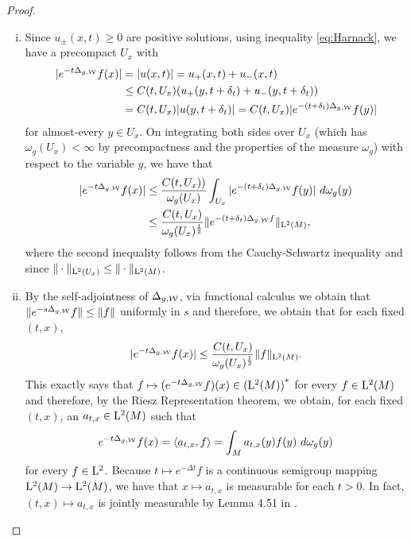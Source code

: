 \documentclass[a4paper, 12pt]{amsart}
\begin{document}
\begin{proof}
\begin{enumerate}[(i)]
\item  Since $u_{\pm}(x,t) \geq 0$ are positive solutions,
	using inequality \eqref{eq:Harnack}, we have a precompact $U_x$ 
	with 
	\begin{align*} 
	|e^{-t \Delta_{g,\mathcal{W}}}f(x)|  &= |u(x,t)| = u_+(x,t) + u_-(x,t) \\
		&\leq C(t,U_x) (u_+(y,t+\delta_t) + u_-(y,t+\delta_t)) \\
		&= C(t,U_x) |u(y,t + \delta_t)|
		= C(t,U_x)  |e^{-(t + \delta_t) \Delta_{g,\mathcal{W}}}f(y)|
	\end{align*} 
	for almost-every $y \in U_x$.
	On integrating both sides over $U_x$ (which has $\omega_g(U_x) < \infty$
	by precompactness and the properties of the measure $\omega_g$) with respect
	to the variable $y$,
	we have that
	\begin{align*} 
	|e^{-t \Delta_{g,\mathcal{W}}}f(x)| 
		&\leq \frac{C(t,U_x))}{\omega_g(U_x)} \int_{U_x} |e^{-(t + \delta_t) \Delta_{g,\mathcal{W}}}f(y)|\ d\omega_g(y) \\
		&\leq \frac{C(t,U_x)}{\omega_g(U_x)^{\frac{1}{2}}} \| e^{-(t + \delta_t) \Delta_{g,\mathcal{W}}f} \|_{{\rm L}^{2}_{\rm {}}(M)},
	\end{align*}
	where the second inequality follows from the Cauchy-Schwartz
	inequality and since $\| \cdot \|_{{\rm L}^{2}_{\rm {}}(U_x)} \leq \| \cdot \|_{{\rm L}^{2}_{\rm {}}(M)}$.

\item By the self-adjointness of $\Delta_{g,\mathcal{W}}$, via functional calculus 
	we obtain that $\| e^{-s\Delta_{g,\mathcal{W}}}f \| \leq \| f \|$
	uniformly in $s$  and therefore, we obtain that for each fixed \((t, x)\),
	$$|e^{-t \Delta_{g,\mathcal{W}}}f(x)| \leq 
		\frac{C(t,U_x)}{\omega_g(U_x)^{\frac{1}{2}}} \| f \|_{{\rm L}^{2}_{\rm {}}(M)}.$$
	This exactly says that $f \mapsto (e^{-t\Delta_{g,\mathcal{W}}}f)(x) \in {({\rm L}^{2}_{\rm {}}(M))}^\ast$
	for every $f \in {\rm L}^{2}_{\rm {}}(M)$ and therefore, by the Riesz Representation theorem,
	we obtain, for each fixed \((t, x)\), an $a_{t,x} \in {\rm L}^{2}_{\rm {}}(M)$ such that
	$$ e^{-t \Delta_{g,\mathcal{W}}}f(x) = \langle a_{t,x},f \rangle = \int_{M} a_{t,x}(y)f(y)\ d\omega_g(y)$$
        for every \(f \in {\rm L}^{2}_{\rm {}}\). Because \(t \mapsto e^{-\Delta t} f\) is a continuous semigroup mapping 
	\({\rm L}^{2}_{\rm {}}(M) \to {\rm L}^{2}_{\rm {}}(M)\), we have that \(x \mapsto a_{t,x}\) is measurable for each $t > 0$.
	In fact, \((t, x) \mapsto a_{t,x}\) is jointly measurable by Lemma 4.51 in \cite{AB}.


\end{enumerate}
\end{proof}
\end{document}
